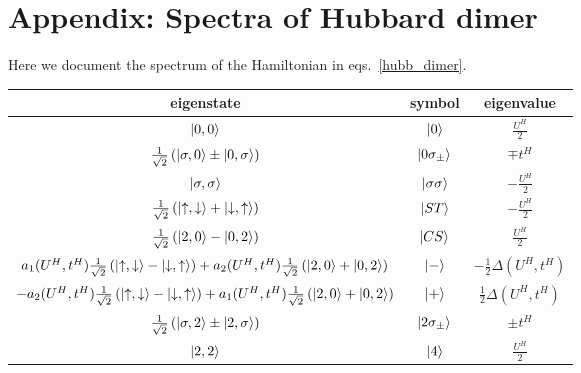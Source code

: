 \documentclass{article}
\numberwithin{equation}{section}
\begin{document}
\newpage
\section*{Appendix: Spectra of Hubbard dimer}
Here we document the spectrum of the Hamiltonian in eqs.~\ref{hubb_dimer}.
\begin{center}
	\begin{tabular}{|c|c|c|}
	\hline
	eigenstate & symbol & eigenvalue \\
	\hline
	$\ket{0,0}$ & $\ket{0}$ & \( \frac{U^H}{2}\)\\
	$ \frac{1}{\sqrt 2}\left(\ket{\sigma,0} \pm \ket{0,\sigma}\right)$ & $\ket{0\sigma_\pm}$ & \(\mp t^H\)\\
	$\ket{\sigma,\sigma}$ & $\ket{\sigma\sigma}$ & \( -\frac{U^H}{2}\)\\
	$ \frac{1}{\sqrt 2}\left(\ket{\uparrow,\downarrow} + \ket{\downarrow,\uparrow}\right)$ & $\ket{ST}$ & \( -\frac{U^H}{2}\)\\
	$ \frac{1}{\sqrt 2}\left(\ket{2,0} - \ket{0,2}\right)$ & $\ket{CS}$ & \( \frac{U^H}{2}\)\\
	$a_1(U^H, t^H) \frac{1}{\sqrt 2}\left(\ket{\uparrow,\downarrow} - \ket{\downarrow,\uparrow}\right) + a_2(U^H, t^H)\frac{1}{\sqrt 2}\left(\ket{2,0} + \ket{0,2}\right)$ & $\ket{-}$ & \(-\frac{1}{2}\Delta(U^H, t^H)\)\\
	$-a_2(U^H, t^H) \frac{1}{\sqrt 2}\left(\ket{\uparrow,\downarrow} - \ket{\downarrow,\uparrow}\right) + a_1(U^H, t^H)\frac{1}{\sqrt 2}\left(\ket{2,0} + \ket{0,2}\right)$ & $\ket{+}$ & \(\frac{1}{2}\Delta(U^H, t^H)\)\\
	$ \frac{1}{\sqrt 2}\left(\ket{\sigma,2} \pm \ket{2,\sigma}\right)$ & $\ket{2\sigma_\pm}$ & \(\pm t^H\)\\
	$\ket{2,2}$ & $\ket{4}$ & \( \frac{U^H}{2}\)\\
\hline
	\end{tabular}
	\label{hubb_dim_spectrum}

\end{center}
\end{document}
